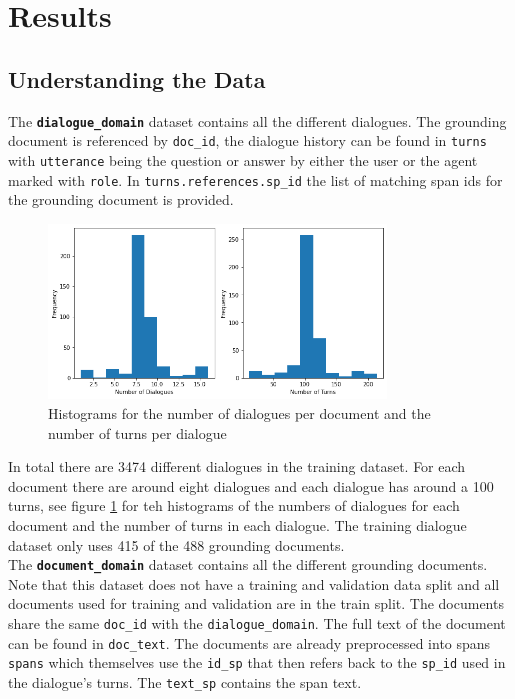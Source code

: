 \documentclass[11pt]{article}
\begin{document}
    \section{Results}\label{sec:results}

    \subsection{Understanding the Data}\label{subsec:understanding-the-data-results}

    The \textbf{\texttt{dialogue\_domain}} dataset contains all the different dialogues. The grounding document is referenced
    by \texttt{doc\_id}, the dialogue history can be found in \texttt{turns} with \texttt{utterance} being the question
    or answer by either the user or the agent marked with \texttt{role}. In \texttt{turns.references.sp\_id} the list of
    matching span ids for the grounding document is provided.

    \begin{figure}[h]
        \centering
        \includegraphics[width=0.8\textwidth]{number_of_dialogues_and_turns}
        \caption{Histograms for the number of dialogues per document and the number of turns per dialogue}
        \label{fig:histogram-dialogue-and-turns}
    \end{figure}

    In total there are 3474 different dialogues in the training dataset. For each document there are around eight dialogues and
    each dialogue has around a 100 turns, see figure \ref{fig:histogram-dialogue-and-turns} for teh histograms of the numbers of
    dialogues for each document and the number of turns in each dialogue.
    The training dialogue dataset only uses 415 of the 488 grounding documents.\\

    The \textbf{\texttt{document\_domain}} dataset contains all the different grounding documents. Note that this dataset does not have
    a training and validation data split and all documents used for training and validation are in the train split.
    The documents share the same \texttt{doc\_id} with the \texttt{dialogue\_domain}. The full text of the document
    can be found in \texttt{doc\_text}. The documents are already preprocessed into spans \texttt{spans} which themselves
    use the \texttt{id\_sp} that then refers back to the \texttt{sp\_id} used in the dialogue's turns. The \texttt{text\_sp}
    contains the span text.
\end{document}

